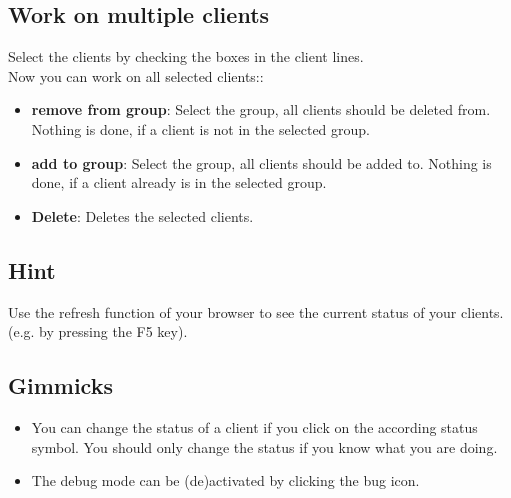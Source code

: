 \subsection{Work on multiple clients}
Select the clients by checking the boxes in the client lines.\\
Now you can work on all selected clients::\\
\begin{itemize}
	\item \textbf{remove from group}: Select the group, all clients should be deleted from. Nothing is done, if a client is not in the selected group.\\
	\item \textbf{add to group}: Select the group, all clients should be added to. Nothing is done, if a client already is in the selected group.\\
	\item \textbf{Delete}: Deletes the selected clients.\\
\end{itemize}
\subsection{Hint}
Use the refresh function of your browser to see the current status of your clients. (e.g. by pressing the F5 key).\\
\subsection{Gimmicks}
\begin{itemize}
\item You can change the status of a client if you click on the according status symbol. You should only change the status if you know what you are doing.\\
\item The debug mode can be (de)activated by clicking the bug icon.\\
\end{itemize}
